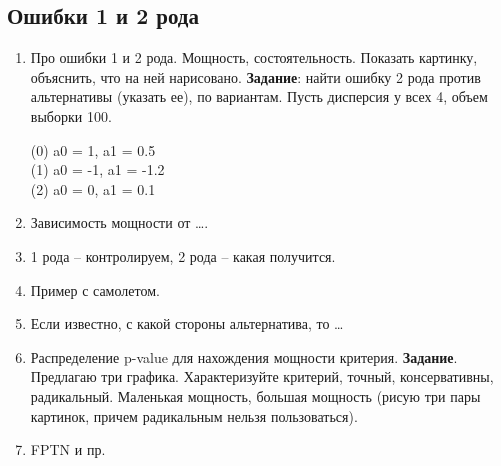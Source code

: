 \subsection{Ошибки 1 и 2 рода}
\begin{enumerate}
\item	Про ошибки 1 и 2 рода. Мощность, состоятельность. Показать картинку, объяснить, что на ней нарисовано.
\textbf{Задание}: найти ошибку 2 рода против альтернативы (указать ее), по вариантам.
Пусть дисперсия у всех 4, объем выборки 100.

(0) a0 = 1, a1 = 0.5\\
(1) a0 = -1, a1 = -1.2\\
(2) a0 = 0, a1 = 0.1\\
\item	Зависимость мощности от ….
\item	1 рода – контролируем, 2 рода – какая получится.
\item	Пример с самолетом.
\item	Если известно, с какой стороны альтернатива, то …

\item	Распределение p-value для нахождения мощности критерия. \textbf{Задание}. Предлагаю три графика. Характеризуйте критерий, точный, консервативны, радикальный. Маленькая мощность, большая мощность (рисую три пары картинок, причем радикальным нельзя пользоваться).

\item	FPTN и пр.
\end{enumerate}

